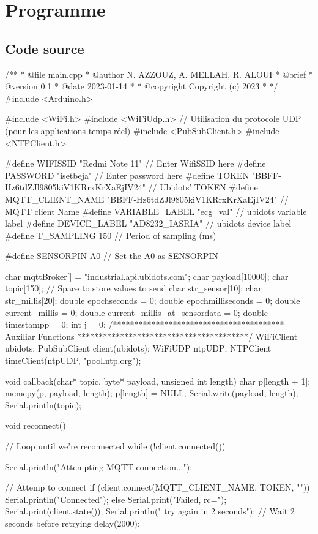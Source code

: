 \chapter{Programme}
\section{Code source\label{codesource}}
\begin{mycpp}
  /**
* @file main.cpp
* @author N. AZZOUZ, A. MELLAH, R. ALOUI
* @brief 
* @version 0.1
* @date 2023-01-14
* 
* @copyright Copyright (c) 2023
* 
*/
#include <Arduino.h>

#include <WiFi.h>
#include <WiFiUdp.h>  // Utilisation du protocole UDP (pour les applications temps réel)
#include <PubSubClient.h>
#include <NTPClient.h>


#define WIFISSID "Redmi Note 11" // Enter WifiSSID here
#define PASSWORD "isetbeja" // Enter password here
#define TOKEN "BBFF-Hz6tdZJl9805kiV1KRrxKrXaEjIV24" // Ubidots' TOKEN
#define MQTT_CLIENT_NAME "BBFF-Hz6tdZJl9805kiV1KRrxKrXaEjIV24" // MQTT client Name
#define VARIABLE_LABEL "ecg_val" // ubidots variable label
#define DEVICE_LABEL "AD8232_IASRIA" // ubidots device label
#define T_SAMPLING 150 // Period of sampling (ms)


#define SENSORPIN A0 // Set the A0 as SENSORPIN

char mqttBroker[]  = "industrial.api.ubidots.com";
char payload[10000];
char topic[150];
// Space to store values to send
char str_sensor[10];
char str_millis[20];
double epochseconds = 0;
double epochmilliseconds = 0;
double current_millis = 0;
double current_millis_at_sensordata = 0;
double timestampp = 0;
int j = 0;
/****************************************
 Auxiliar Functions
****************************************/
WiFiClient ubidots;
PubSubClient client(ubidots);
WiFiUDP ntpUDP;
NTPClient timeClient(ntpUDP, "pool.ntp.org");

void callback(char* topic, byte* payload, unsigned int length) {
char p[length + 1];
memcpy(p, payload, length);
p[length] = NULL;
Serial.write(payload, length);
Serial.println(topic);
}

void reconnect() {
// Loop until we're reconnected
while (!client.connected()) {
  Serial.println("Attempting MQTT connection...");

  // Attemp to connect
  if (client.connect(MQTT_CLIENT_NAME, TOKEN, "")) {
    Serial.println("Connected");
  } else {
    Serial.print("Failed, rc=");
    Serial.print(client.state());
    Serial.println(" try again in 2 seconds");
    // Wait 2 seconds before retrying
    delay(2000);
  }
}
}


\end{mycpp}
